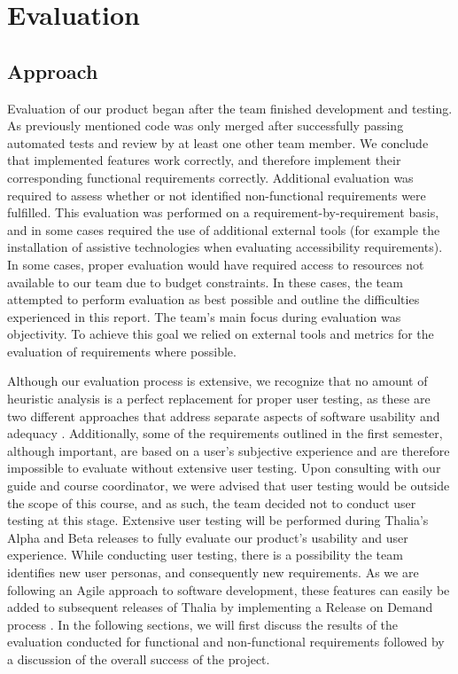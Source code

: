 \documentclass[main.tex]{subfiles}
\begin{document}
\section{Evaluation}

\subsection{Approach}
Evaluation of our product began after the team finished development and testing. As previously mentioned code was only merged after successfully passing automated tests and review by at least one other team member. We conclude that implemented features work correctly, and therefore implement their corresponding functional requirements correctly. Additional evaluation was required to assess whether or not identified non-functional requirements were fulfilled. This evaluation was performed on a requirement-by-requirement basis, and in some cases required the use of additional external tools (for example the installation of assistive technologies when evaluating accessibility requirements). In some cases, proper evaluation would have required access to resources not available to our team due to budget constraints. In these cases, the team attempted to perform evaluation as best possible and outline the difficulties experienced in this report. The team's main focus during evaluation was objectivity. To achieve this goal we relied on external tools and metrics for the evaluation of requirements where possible.

Although our evaluation process is extensive, we recognize that no amount of heuristic analysis is a perfect replacement for proper user testing, as these are two different approaches that address separate aspects of software usability and adequacy \cite{userTestingGood}. Additionally, some of the requirements outlined in the first semester, although important, are based on a user's subjective experience and are therefore impossible to evaluate without extensive user testing. Upon consulting with our guide and course coordinator, we were advised that user testing would be outside the scope of this course, and as such, the team decided not to conduct user testing at this stage. Extensive user testing will be performed during Thalia’s Alpha and Beta releases to fully evaluate our product's usability and user experience. While conducting user testing, there is a possibility the team identifies new user personas, and consequently new requirements. As we are following an Agile approach to software development, these features can easily be added to subsequent releases of Thalia by implementing a Release on Demand process \cite{releaseOnDemand}.
In the following sections, we will first discuss the results of the evaluation conducted for functional and non-functional requirements followed by a discussion of the overall success of the project.
\end{document}

